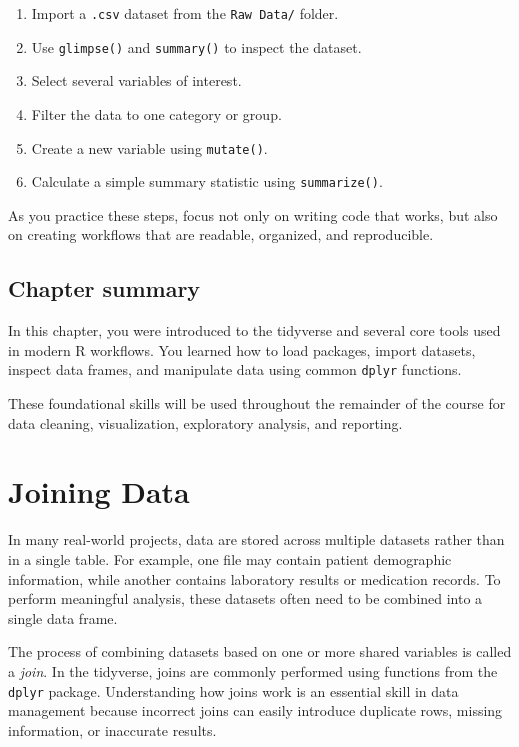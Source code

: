 \documentclass[
  11pt,
  oneside]{book}
\providecommand{\tightlist}{%
  \setlength{\itemsep}{0pt}\setlength{\parskip}{0pt}}
\begin{document}
\begin{enumerate}
\def\labelenumi{\arabic{enumi}.}
\tightlist
\item
  Import a \texttt{.csv} dataset from the \texttt{Raw\ Data/} folder.
\item
  Use \texttt{glimpse()} and \texttt{summary()} to inspect the dataset.
\item
  Select several variables of interest.
\item
  Filter the data to one category or group.
\item
  Create a new variable using \texttt{mutate()}.
\item
  Calculate a simple summary statistic using \texttt{summarize()}.
\end{enumerate}

As you practice these steps, focus not only on writing code that works, but also on creating workflows that are readable, organized, and reproducible.

\section{Chapter summary}\label{chapter-summary-1}

In this chapter, you were introduced to the tidyverse and several core tools used in modern R workflows. You learned how to load packages, import datasets, inspect data frames, and manipulate data using common \texttt{dplyr} functions.

These foundational skills will be used throughout the remainder of the course for data cleaning, visualization, exploratory analysis, and reporting.

\chapter{Joining Data}\label{joining-data}

In many real-world projects, data are stored across multiple datasets rather than in a single table. For example, one file may contain patient demographic information, while another contains laboratory results or medication records. To perform meaningful analysis, these datasets often need to be combined into a single data frame.

The process of combining datasets based on one or more shared variables is called a \emph{join}. In the tidyverse, joins are commonly performed using functions from the \texttt{dplyr} package. Understanding how joins work is an essential skill in data management because incorrect joins can easily introduce duplicate rows, missing information, or inaccurate results.
\end{document}
